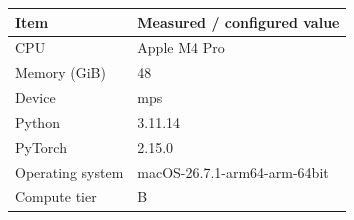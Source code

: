 \begin{tabular}{ll}
\toprule
Item & Measured / configured value \\
\midrule
CPU & Apple M4 Pro \\
Memory (GiB) & 48 \\
Device & mps \\
Python & 3.11.14 \\
PyTorch & 2.15.0 \\
Operating system & macOS-26.7.1-arm64-arm-64bit \\
Compute tier & B \\
\bottomrule
\end{tabular}
